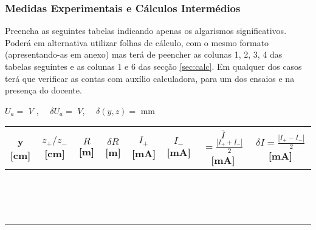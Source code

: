 \documentclass[a4paper,12pt]{article}  %
\begin{document}
\subsubsection{\sf Medidas Experimentais e Cálculos Intermédios } \label{sec:dados}
Preencha as seguintes tabelas indicando  apenas os algarismos significativos. Poderá em alternativa utilizar folhas de cálculo, com o mesmo formato (apresentando-as em anexo) mas terá de peencher as colunas 1, 2, 3, 4 das tabelas seguintes e as colunas 1 e 6 das secção \ref{sec:calc}. Em qualquer dos casos terá que verificar as contas com auxílio calculadora, para um dos ensaios e na presença do docente.

\begin{center}
	\noindent	$U_a =$ \underline{\makebox[1.5cm][r]{~}} $V$ ,  $\quad \delta U_a=$	\underline{\makebox[1cm][r]{~}} $V$, $\quad \delta (y,z)=$ \underline{\makebox[1cm][r]{~}} mm  \\

	\renewcommand{\arraystretch}{0.75}
	\begin{tabular}{|c|c|c|c|c|c|c|c|}
	\hline
	y [cm]  & $z_+/z_-$ [cm]  & $R$ [m] & $\delta R$ [m] & $I_+$ [mA] & $I_-$ [mA] & $\overline{I}$   {\tiny $ = \frac{| I_+ + I_-|}{2}$ [mA] } & {\tiny $\delta I = \frac{| I_+ - I_-|}{2}$ [mA] } \\
	\hline
	 &  &  &  & &  &  & \\ \cline{5-8}
	 &  &  &  & &  & & \\ \cline{5-8}
	 &  &  &  & &  & & \\ \cline{5-8}
	 \hline
	 &  &  &  & &  & & \\ \cline{5-8}
	 &  &  &  & &  & & \\ \cline{5-8}
	 &  &  &  & &  & & \\ \cline{5-8}
	 \hline
	 &  &  &  & &  & & \\ \cline{5-8}
	 &  &  &  & &  & & \\ \cline{5-8}
	 &  &  &  & &  & & \\ \cline{5-8}
	 \hline
	 &  &  &  & &  & & \\ \cline{5-8}
	 &  &  &  & &  & & \\ \cline{5-8}
	 &  &  &  & &  & & \\ \cline{5-8}
	 \hline
	 &  &  &  & &  & & \\ \cline{5-8}
	 &  &  &  & &  & & \\ \cline{5-8}
	 &  &  &  & &  & & \\ \cline{5-8}
	 \hline
 	\end{tabular}
	

\end{center}
\end{document}

